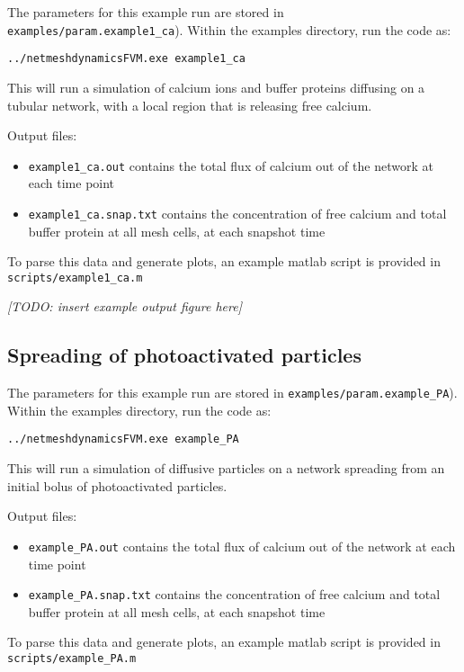 \documentclass[12pt]{article}
\newcommand{\comment}[1]{{\color{red} \it [#1]}}
\begin{document}
The parameters for this example run are stored in \verb=examples/param.example1_ca=). 
Within the examples directory, run the code as:

\begin{verbatim}
../netmeshdynamicsFVM.exe example1_ca
\end{verbatim}

This will run a simulation of calcium ions and buffer proteins diffusing on a tubular network, with a local region that is releasing free calcium.

Output files:
\begin{itemize}
	\item \verb=example1_ca.out= contains the total flux of calcium out of the network at each time point
	\item \verb=example1_ca.snap.txt= contains the concentration of free calcium and total buffer protein at all mesh cells, at each snapshot time
\end{itemize}

To parse this data and generate plots, an example matlab script is provided in \verb=scripts/example1_ca.m=

\comment{TODO: insert example output figure here}

\subsection{Spreading of photoactivated particles}
The parameters for this example run are stored in \verb=examples/param.example_PA=). 
Within the examples directory, run the code as:

\begin{verbatim}
../netmeshdynamicsFVM.exe example_PA
\end{verbatim}

This will run a simulation of diffusive particles on a network spreading from an initial bolus of photoactivated particles.

\noindent Output files:
\begin{itemize}
	\item \verb=example_PA.out= contains the total flux of calcium out of the network at each time point
	\item \verb=example_PA.snap.txt= contains the concentration of free calcium and total buffer protein at all mesh cells, at each snapshot time
\end{itemize}

\noindent To parse this data and generate plots, an example matlab script is provided in \verb=scripts/example_PA.m=
\end{document}
